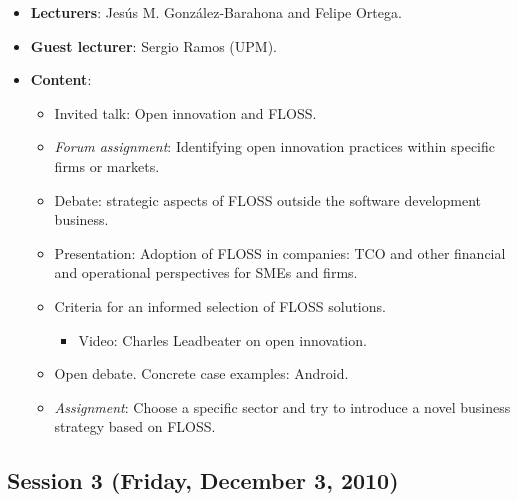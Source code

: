 \documentclass[a4paper]{article}
\begin{document}
\begin{itemize}
 \item \textbf{Lecturers}: Jesús M. González-Barahona and Felipe Ortega.
 \item \textbf{Guest lecturer}: Sergio Ramos (UPM).

 \item \textbf{Content}:

    \begin{itemize}
     \item Invited talk: Open innovation and FLOSS.
     \item \textit{Forum assignment}: Identifying open innovation practices within specific firms or markets.

     \item Debate: strategic aspects of FLOSS outside the software development business.
        \item Presentation: Adoption of FLOSS in companies: TCO and other financial and 
	operational perspectives for SMEs and firms.
	\item Criteria for an informed selection of FLOSS solutions.
	\begin{itemize}
	 \item Video: Charles Leadbeater on open innovation.
	\end{itemize}
	\item Open debate. Concrete case examples: Android.
        \item \textit{Assignment}: Choose a specific sector and try to introduce a novel business strategy
	based on FLOSS.
    \end{itemize}

\end{itemize}

\subsection{Session 3 (Friday, December 3, 2010)}
\end{document}
